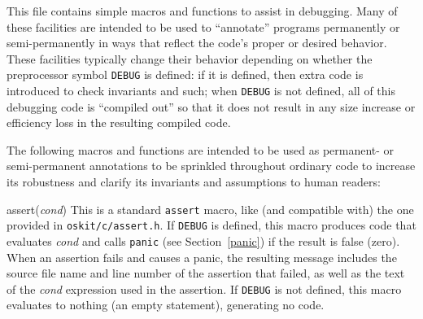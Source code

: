 \begin{apisyn}

\end{apisyn}
\begin{apidesc}
	This file contains simple macros and functions to assist in
	debugging.  Many of these facilities
	are intended to be used to ``annotate'' programs
	permanently or semi-permanently in ways that reflect
	the code's proper or desired behavior.
	These facilities typically change their behavior
	depending on whether the preprocessor symbol {\tt DEBUG} is defined:
	if it is defined, then extra code is introduced
	to check invariants and such;
	when {\tt DEBUG} is not defined,
	all of this debugging code is ``compiled out''
	so that it does not result in any size increase or efficiency loss
	in the resulting compiled code.

	The following macros and functions
	are intended to be used as permanent- or semi-permanent annotations
	to be sprinkled throughout ordinary code to increase its robustness
	and clarify its invariants and assumptions to human readers:
	\begin{csymlist}
	\item[assert(\emph{cond})]	
		This is a standard {\tt assert} macro,
		like (and compatible with) the one provided
		in {\tt oskit/c/assert.h}.
		If {\tt DEBUG} is defined,
		this macro produces code that evaluates \emph{cond}
		and calls {\tt panic} (see Section~\ref{panic})
		if the result is false (zero).
		When an assertion fails and causes a panic,
		the resulting message
		includes the source file name and line number
		of the assertion that failed,
		as well as the text of the \emph{cond} expression
		used in the assertion.
		If {\tt DEBUG} is not defined,
		this macro evaluates to nothing (an empty statement),
		generating no code.


\end{csymlist}
\end{apidesc}
